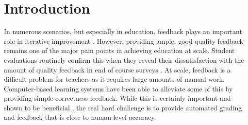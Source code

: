 \documentclass[12pt]{report}
\begin{document}






\setcounter{page}{1}

% 
%



\chapter{Introduction}
In numerous scenarios, but especially in education, feedback plays an important role in iterative improvement \cite{schartel_2012}. However, providing ample, good quality feedback remains one of the major pain points in achieving education at scale. Student evaluations routinely confirm this when they reveal their dissatisfaction with the amount of quality feedback in end of course surveys \cite{rowe2008student}. At scale, feedback is a difficult problem for teachers as it requires large amounts of manual work. Computer-based learning systems have been able to alleviate some of this by providing simple correctness feedback. While this is certainly important and shown to be beneficial \cite{Kehrer2013DoesIF}, 
the real hard challenge is to provide automated grading and feedback that is close to human-level accuracy.
\end{document}
